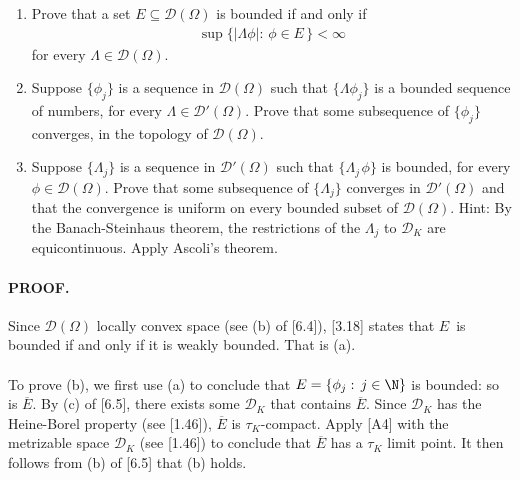 \renewcommand{\labelenumi}{(\alph{enumi})} 
{\CMUCS 
\begin{enumerate}
\item Prove that a set $E\subseteq \mathscr{D}(\Omega)$ is bounded if and only if 
\begin{align*}
\sup \{\lvert\Lambda \phi\rvert:\, \phi \in E\,\}< \infty
\end{align*} 
for every $\Lambda \in \mathscr{D}(\Omega)$.
\item Suppose $\{\phi_j\}$ is a sequence in $\mathscr{D}(\Omega)$ such that $\{\Lambda \phi_j\}$ is a bounded sequence of numbers, for every $\Lambda \in \mathscr{D}'(\Omega)$. Prove that some subsequence of $\{\phi_j\}$ converges, in the topology of $\mathscr{D}(\Omega)$.
\item Suppose $\{\Lambda _j\}$ is a sequence in $\mathscr{D}'(\Omega)$ such that $\{\Lambda_{j\,} \phi\}$ is bounded, for every $\phi \in \mathscr{D}(\Omega)$. Prove that some subsequence of $\{\Lambda _j\}$ converges in $\mathscr{D}'(\Omega)$ and that the convergence is uniform on every bounded subset of $\mathscr{D}(\Omega)$. Hint: By the Banach-Steinhaus theorem, the restrictions of the $\Lambda_j$ to $\mathscr{D}_K$ are equicontinuous. Apply Ascoli's theorem.
\end{enumerate}}
\paragraph{PROOF.} 
Since $\mathscr{D}(\Omega)$ locally convex space (see (b) of [6.4]), [3.18] states that $E\,$ is bounded if and only if it is weakly bounded. That is (a). \\
\\
To prove (b), we first use (a) to conclude that $E= \{\phi_j:\, j\in \N\}$ is bounded: so is $\overline{E}$. By (c) of [6.5], there exists some $ \mathscr{D}_K$ that contains $\overline{E}$. Since $ \mathscr{D}_K$ has the Heine-Borel property (see [1.46]), $\overline{E}$ is $\tau_K$-compact. Apply [A4] with the metrizable space $\mathscr{D}_K$ (see [1.46]) to conclude that $\overline{E}$ has a $\tau_K$ limit point. It then follows from (b) of [6.5] that (b) holds.